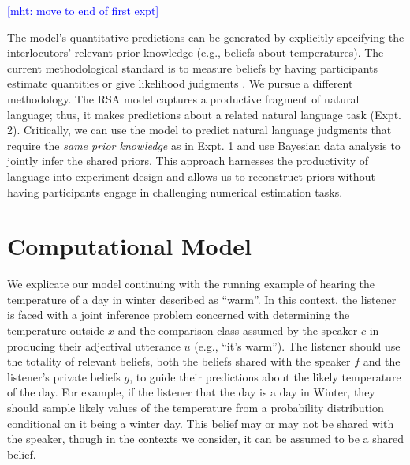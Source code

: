 \documentclass[doc]{apa6}
\begin{document}

\textcolor{Blue}{[mht: move to end of first expt]}

The model's quantitative predictions can be generated by explicitly
specifying the interlocutors' relevant prior knowledge (e.g., beliefs
about temperatures). The current methodological standard is to measure
beliefs by having participants estimate quantities or give likelihood
judgments \cite{Franke2016}. We pursue a different methodology. The
RSA model captures a productive fragment of natural language; thus, it
makes predictions about a related natural language task (Expt. 2).
Critically, we can use the model to predict natural language judgments
that require the \emph{same prior knowledge} as in Expt. 1 and use
Bayesian data analysis to jointly infer the shared priors. This approach
harnesses the productivity of language into experiment design and allows
us to reconstruct priors without having participants engage in
challenging numerical estimation tasks.

\section{Computational Model}

We explicate our model continuing with the running example of hearing the temperature of a day in winter described as ``warm''. 
In this context, the listener is faced with a joint inference problem concerned with determining the temperature outside $x$ and the comparison class assumed by the speaker $c$ in producing their adjectival utterance $u$ (e.g., ``it's warm'').
The listener should use the totality of relevant beliefs, both the beliefs shared with the speaker $f$ and the listener's private beliefs $g$, to guide their predictions about the likely temperature of the day. 
For example, if the listener that the day is a day in Winter, they should sample likely values of the temperature from a probability distribution conditional on it being a winter day.
This belief may or may not be shared with the speaker, though in the contexts we consider, it can be assumed to be a shared belief.
\end{document}
